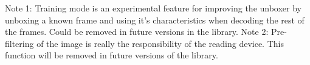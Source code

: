 Note 1: Training mode is an experimental feature for improving the unboxer by unboxing a known frame and using it's characteristics when decoding the rest of the frames. Could be removed in future versions in the library. Note 2: Pre-\/filtering of the image is really the responsibility of the reading device. This function will be removed in future versions of the library. 